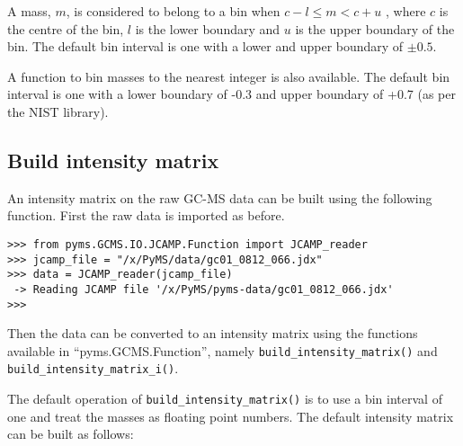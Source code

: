A mass, $m$, is considered to belong to a bin when
$c - l \le m < c + u$
, where $c$ is the centre of the bin, $l$ is the lower boundary and $u$ is
the upper boundary of the bin. The default bin interval is one with a lower and
upper boundary of $\pm0.5$.

A function to bin masses to the nearest integer is also available. The default
bin interval is one with a lower boundary of -0.3 and upper boundary of +0.7 (as
per the NIST library).



\subsection{Build intensity matrix}


An intensity matrix on the raw GC-MS data can be built using the following
function. First the raw data is imported as before.

\begin{verbatim}
>>> from pyms.GCMS.IO.JCAMP.Function import JCAMP_reader
>>> jcamp_file = "/x/PyMS/data/gc01_0812_066.jdx"
>>> data = JCAMP_reader(jcamp_file)
 -> Reading JCAMP file '/x/PyMS/pyms-data/gc01_0812_066.jdx'
>>>
\end{verbatim}

\noindent
Then the data can be converted to an intensity matrix using the functions
available in ``pyms.GCMS.Function'', namely {\tt build\_intensity\_matrix()}
and {\tt build\_intensity\_matrix\_i()}.

The default operation of {\tt build\_intensity\_matrix()} is to use a bin
interval of one and treat the masses as floating point numbers. The default
intensity matrix can be built as follows:

